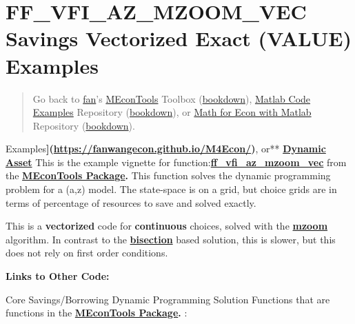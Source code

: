 \documentclass[
]{book}
\begin{document}
\hypertarget{ff_vfi_az_mzoom_vec-savings-vectorized-exact-value-examples}{%
\section{FF\_VFI\_AZ\_MZOOM\_VEC Savings Vectorized Exact (VALUE) Examples}\label{ff_vfi_az_mzoom_vec-savings-vectorized-exact-value-examples}}

\begin{quote}
Go back to \href{http://fanwangecon.github.io/}{fan}'s \href{https://fanwangecon.github.io/MEconTools/}{MEconTools} Toolbox (\href{https://fanwangecon.github.io/MEconTools/bookdown}{bookdown}), \href{https://fanwangecon.github.io/M4Econ/}{Matlab Code Examples} Repository (\href{https://fanwangecon.github.io/M4Econ/bookdown}{bookdown}), or \href{https://fanwangecon.github.io/Math4Econ/}{Math for Econ with Matlab} Repository (\href{https://fanwangecon.github.io/Math4Econ/bookdown}{bookdown}).
\end{quote}

Examples\textbf{{]}(\url{https://fanwangecon.github.io/M4Econ/})}, or** \href{https://fanwangecon.github.io/CodeDynaAsset/}{\textbf{Dynamic
Asset}}
This is the example vignette for function:\href{https://github.com/FanWangEcon/MEconTools/blob/master/MEconTools/vfi/ff_vfi_az_mzoom_vec.m}{\textbf{ff\_vfi\_az\_mzoom\_vec}}
from the \href{https://fanwangecon.github.io/MEconTools/}{\textbf{MEconTools
Package}}\textbf{.} This function
solves the dynamic programming problem for a (a,z) model. The
state-space is on a grid, but choice grids are in terms of percentage of
resources to save and solved exactly.

This is a \textbf{vectorized} code for \textbf{continuous} choices, solved with
the
\href{https://fanwangecon.github.io/MEconTools/MEconTools/doc/optim/htmlpdfm/fx_optim_mzoom_savezrone.html}{\textbf{mzoom}}
algorithm. In contrast to the
\href{https://fanwangecon.github.io/MEconTools/MEconTools/doc/optim/htmlpdfm/fx_optim_bisec_savezrone.html}{\textbf{bisection}}
based solution, this is slower, but this does not rely on first order
conditions.

\textbf{Links to Other Code:}

Core Savings/Borrowing Dynamic Programming Solution Functions that are
functions in the \href{https://fanwangecon.github.io/MEconTools/}{\textbf{MEconTools
Package}}\textbf{.} :
\end{document}
